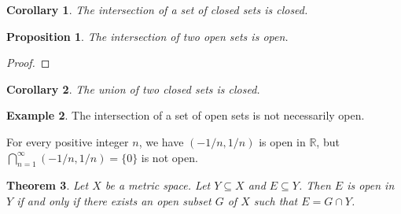 \documentclass{book}
\let\qed\relax
\newtheorem{prop}{Proposition}[chapter]
\newtheorem{cor}{Corollary}[prop]
\newtheorem{thm}[prop]{Theorem}
\theoremstyle{definition}
\newtheorem{ex}[prop]{Example}
\begin{document}
\begin{cor}
The intersection of a set of closed sets is closed.
\end{cor}

\begin{prop}
The intersection of two open sets is open.
\end{prop}

\begin{proof}
\pf
{}
\qed
\end{proof}

\begin{cor}
The union of two closed sets is closed.
\end{cor}

\begin{ex}
The intersection of a set of open sets is not necessarily open.

For every positive integer $n$, we have $(-1/n,1/n)$ is open in $\mathbb{R}$, but $\bigcap_{n=1}^\infty (-1/n,1/n) = \{0\}$ is not open.
\end{ex}

\begin{thm}
Let $X$ be a metric space. Let $Y \subseteq X$ and $E \subseteq Y$. Then $E$ is open in $Y$ if and only if there exists an open subset $G$ of $X$ such that $E = G \cap Y$.
\end{thm}
\end{document}
